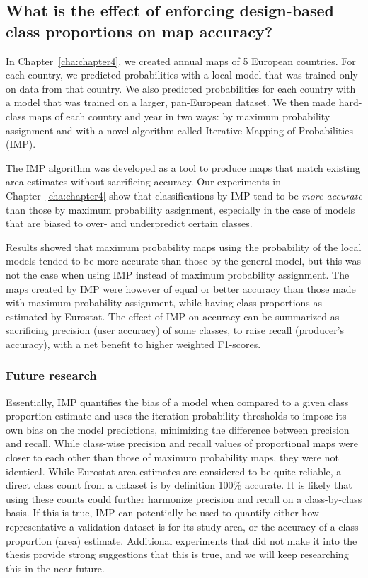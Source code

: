     \subsection{What is the effect of enforcing design-based class proportions on map accuracy?}
    \label{syn:rq4}
 
        In Chapter\@~\ref{cha:chapter4}, we created annual maps of 5 European countries. For each country, we predicted probabilities with a local model that was trained only on data from that country. We also predicted probabilities for each country with a model that was trained on a larger, pan-European dataset. We then made hard-class maps of each country and year in two ways: by maximum probability assignment and with a novel algorithm called Iterative Mapping of Probabilities (IMP).
        
        The IMP algorithm was developed as a tool to produce maps that match existing area estimates without sacrificing accuracy. Our experiments in Chapter\@~\ref{cha:chapter4} show that classifications by IMP tend to be \textit{more accurate} than those by maximum probability assignment, especially in the case of models that are biased to over- and underpredict certain classes. 
        
        Results showed that maximum probability maps using the probability of the local models tended to be more accurate than those by the general model, but this was not the case when using IMP instead of maximum probability assignment. The maps created by IMP were however of equal or better accuracy than those made with maximum probability assignment, while having class proportions as estimated by Eurostat. The effect of IMP on accuracy can be summarized as sacrificing precision (user accuracy) of some classes, to raise recall (producer's accuracy), with a net benefit to higher weighted F1-scores.

        \subsubsection{Future research}
        
        Essentially, IMP quantifies the bias of a model when compared to a given class proportion estimate and uses the iteration probability thresholds to impose its own bias on the model predictions, minimizing the difference between precision and recall.
        While class-wise precision and recall values of proportional maps were closer to each other than those of maximum probability maps, they were not identical. While Eurostat area estimates are considered to be quite reliable, a direct class count from a dataset is by definition 100\% accurate. It is likely that using these counts could further harmonize precision and recall on a class-by-class basis. If this is true, IMP can potentially be used to quantify either how representative a validation dataset is for its study area, or the accuracy of a class proportion (area) estimate. Additional experiments that did not make it into the thesis provide strong suggestions that this is true, and we will keep researching this in the near future.
        
